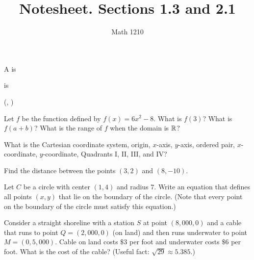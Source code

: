 \documentclass[12pt, a4paper]{article}
\author{Math 1210}
\title{Notesheet.  Sections 1.3 and 2.1}
\date{}
\begin{document}
\maketitle
\nameline
\begin{defi}
	A  is
\end{defi}
\begin{defi}
	 is
\end{defi}
\begin{defi}
	(, )
\end{defi}
\begin{ex}
	Let $f$ be the function defined by $f(x) = 6x^2 - 8$.  What is
        $f(3)$?  What is $f(a+b)$? What is the range of \(f\) when the
        domain is \({\mathbb R}\)?
\end{ex}
\begin{defi}
	What is the Cartesian coordinate system, origin, $x$-axis, $y$-axis, ordered pair, $x$-coordinate, $y$-coordinate, Quadrants I, II, III, and IV?
	\vspace{1.3in}
\end{defi}
\begin{defi}

\end{defi}
\begin{defi}

\end{defi}
\begin{ex}
	Find the distance between the points $(3, 2)$ and $(8, -10)$.
\end{ex}
\begin{ex}
	Let $C$ be a circle with center $(1,4)$ and radius $7$.  Write an equation that defines all points $(x,y)$ that lie on the boundary of the circle.  (Note that every point on the boundary of the circle must satisfy this equation.)
\end{ex}
\begin{ex}
	Consider a straight shoreline with a station $S$ at point
        $(8{,}000, 0)$ and a cable that runs to point $Q = (2{,}000,
        0)$ (on land) and then runs underwater to point $M = (0, 5{,}000)$.
        Cable on land costs $\$3$ per foot and underwater costs $\$6$
        per foot.  What is the cost of the cable? (Useful fact:
        \(\sqrt{29} \approx 5.385\).)
\end{ex}



\end{document}
